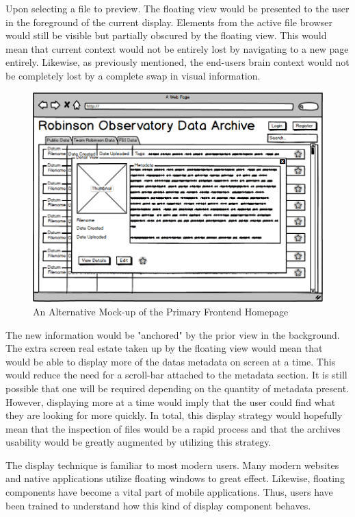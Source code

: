 \documentclass[12pt]{article}
\begin{document}
Upon selecting a file to preview. The floating view would be presented to the user in the foreground of the current display. Elements from the active file browser would still be visible but partially obscured by the floating view. This would mean that current context would not be entirely lost by navigating to a new page entirely. Likewise, as previously mentioned, the end-users brain context would not be completely lost by a complete swap in visual information.

\begin{figure}[h]
	\centering
	\includegraphics[width=\linewidth]{frontend_floating}
	\caption{An Alternative Mock-up of the Primary Frontend Homepage}
	\label{fig:frontendfloating}
\end{figure}

The new information would be "anchored" by the prior view in the background. The extra screen real estate taken up by the floating view would mean that would be able to display more of the datas metadata on screen at a time. This would reduce the need for a scroll-bar attached to the metadata section. It is still possible that one will be required depending on the quantity of metadata present. However, displaying more at a time would imply that the user could find what they are looking for more quickly. In total, this display strategy would hopefully mean that the inspection of files would be a rapid process and that the archives usability would be greatly augmented by utilizing this strategy.

The display technique is familiar to most modern users. Many modern websites and native applications utilize floating windows to great effect. Likewise, floating components have become a vital part of mobile applications. Thus, users have been trained to understand how this kind of display component behaves.
\end{document}
